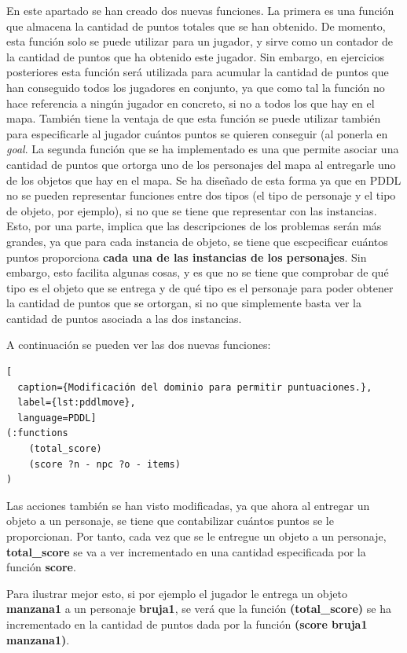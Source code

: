 \documentclass[11pt,a4paper]{article}
\begin{document}
En este apartado se han creado dos nuevas funciones. La primera es una función que almacena la cantidad de puntos totales que se
han obtenido. De momento, esta función solo se puede utilizar para un jugador, y sirve como un contador de la cantidad de puntos
que ha obtenido este jugador. Sin embargo, en ejercicios posteriores esta función será utilizada para acumular la cantidad de puntos
que han conseguido todos los jugadores en conjunto, ya que como tal la función no hace referencia a ningún jugador en concreto, si no 
a todos los que hay en el mapa. También tiene la ventaja de que esta función se puede utilizar también para especificarle al jugador
cuántos puntos se quieren conseguir (al ponerla en \textit{goal}. La segunda función que se ha implementado es una que permite asociar
una cantidad de puntos que ortorga uno de los personajes del mapa al entregarle uno de los objetos que hay en el mapa. Se ha diseñado
de esta forma ya que en PDDL no se pueden representar funciones entre dos tipos (el tipo de personaje y el tipo de objeto, por
ejemplo), si no que se tiene que representar con las instancias. Esto, por una parte, implica que las descripciones de los problemas
serán más grandes, ya que para cada instancia de objeto, se tiene que escpecificar cuántos puntos proporciona \textbf{cada una de las
instancias de los personajes}. Sin embargo, esto facilita algunas cosas, y es que no se tiene que comprobar de qué tipo es el objeto
que se entrega y de qué tipo es el personaje para poder obtener la cantidad de puntos que se ortorgan, si no que simplemente basta ver
la cantidad de puntos asociada a las dos instancias.

A continuación se pueden ver las dos nuevas funciones:

\begin{algorithm}[H]
\begin{lstlisting}[
  caption={Modificación del dominio para permitir puntuaciones.},
  label={lst:pddlmove},
  language=PDDL]
(:functions
    (total_score)
    (score ?n - npc ?o - items)
)
\end{lstlisting}
\end{algorithm}

Las acciones también se han visto modificadas, ya que ahora al entregar un objeto a un personaje, se tiene que contabilizar cuántos
puntos se le proporcionan. Por tanto, cada vez que se le entregue un objeto a un personaje, \textbf{total\_score} se va a ver
incrementado en una cantidad especificada por la función \textbf{score}.

Para ilustrar mejor esto, si por ejemplo el jugador le entrega un objeto \textbf{manzana1} a un personaje \textbf{bruja1}, se verá
que la función \textbf{(total\_score)} se ha incrementado en la cantidad de puntos dada por la función
\textbf{(score bruja1 manzana1)}.
\end{document}
